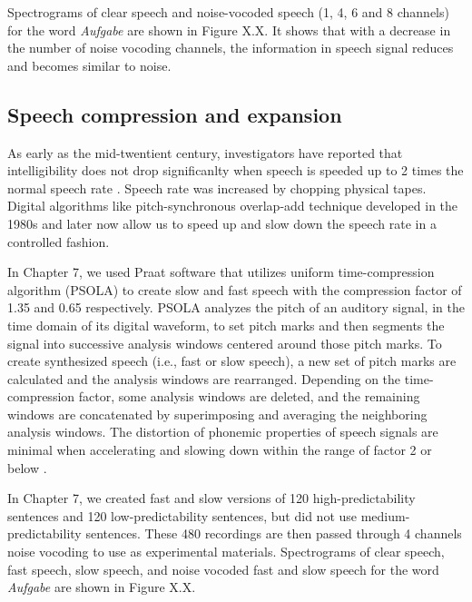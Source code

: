 \documentclass[a4paper, nobind]{templates/ociamthesis}
\begin{document}
Spectrograms of clear speech and noise-vocoded speech (1, 4, 6 and 8 channels) for the word \emph{Aufgabe} are shown in Figure X.X. It shows that with a decrease in the number of noise vocoding channels, the information in speech signal reduces and becomes similar to noise.

\hypertarget{speech-compression-and-expansion}{%
\subsection{Speech compression and expansion}\label{speech-compression-and-expansion}}

As early as the mid-twentient century, investigators have reported that intelligibility does not drop significanlty when speech is speeded up to 2 times the normal speech rate \autocite[e.g.,][]{Garvey1953}.
Speech rate was increased by chopping physical tapes.
Digital algorithms like pitch-synchronous overlap-add technique \autocites[PSOLA,][]{Charpentier1986,Moulines1990} developed in the 1980s and later \autocite[overlap-add technique based on waveform similarity,][]{Verhelst1993} now allow us to speed up and slow down the speech rate in a controlled fashion.

In Chapter 7, we used Praat software that utilizes uniform time-compression algorithm (PSOLA) to create slow and fast speech with the compression factor of 1.35 and 0.65 respectively.
PSOLA analyzes the pitch of an auditory signal, in the time domain of its digital waveform, to set pitch marks and then segments the signal into successive analysis windows centered around those pitch marks.
To create synthesized speech (i.e., fast or slow speech), a new set of pitch marks are calculated and the analysis windows are rearranged.
Depending on the time-compression factor, some analysis windows are deleted, and the remaining windows are concatenated by superimposing and averaging the neighboring analysis windows.
The distortion of phonemic properties of speech signals are minimal when accelerating and slowing down within the range of factor 2 or below \autocite{Moulines1990}.

In Chapter 7, we created fast and slow versions of 120 high-predictability sentences and 120 low-predictability sentences, but did not use medium-predictability sentences.
These 480 recordings are then passed through 4 channels noise vocoding to use as experimental materials.
Spectrograms of clear speech, fast speech, slow speech, and noise vocoded fast and slow speech for the word \emph{Aufgabe} are shown in Figure X.X.
\end{document}
